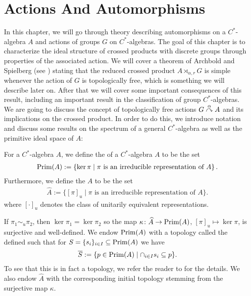 \chapter{Actions And Automorphisms}
In this chapter, we will go through theory describing automorphisms on a $C^*$-algebra $A$ and actions of groups $G$ on $C^*$-algebras. The goal of this chapter is to characterize the ideal structure of crossed products with discrete groups through properties of the associated action. We will cover a theorem of Archbold and Spielberg (see \cite{archbold1994topologically}) stating that the reduced crossed product $A \rtimes_{\alpha,r} G$ is simple whenever the action of $G$ is topologically free, which is something we will describe later on. After that we will cover some important consequences of this result, including an important result in the classification of group $C^*$-algebras.
We are going to discuss the concept of topologically free actions $G \stackrel{\alpha}{\curvearrowright} A$ and its implications on the crossed product. In order to do this, we introduce notation and discuss some results on the spectrum of a general $C^*$-algebra as well as the primitive ideal space of $A$:
\begin{definition}
	For a $C^*$-algebra $A$, we define the  of a $C^*$-algebra $A$ to be the set
	\begin{align*}
		\mathrm{Prim}(A) := \left\{ \ker \pi \mid \pi \text{ is an irreducible representation of } A \right\}.
	\end{align*}
	Furthermore, we define the  $A$ to be the set
	\begin{align*}
		\hat A := \{[\pi]_u \mid \pi \text{ is an irreducible representation of } A \}.
	\end{align*}
where $[\cdot]_u$ denotes the class of unitarily equivalent representations.

If $\pi_1 \sim_u \pi_2$, then $\ker \pi_1 = \ker \pi_2$ so the map $\kappa \colon \widehat{A} \to \mathrm{Prim}(A)$, $[\pi]_u \mapsto \ker \pi$, is surjective and well-defined. We endow $\mathrm{Prim}(A)$ with a topology called the  defined such that for $S = \{s_i\}_{i \in I} \subseteq \mathrm{Prim}(A)$ we have
\begin{align*}
	\overline S := \{ p \in \mathrm{Prim}(A) \mid \cap_{i \in I} s_i \subseteq p\}.
\end{align*}
To see that this is in fact a topology, we refer the reader to \cite[Appendix A.2]{williamsmorita} for the details. We also endow $\hat A$ with the corresponding initial topology stemming from the surjective map $\kappa$.
\end{definition}
